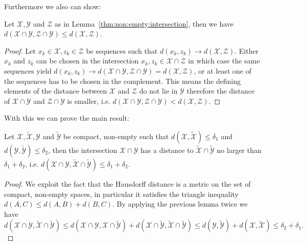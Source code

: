 %
Furthermore we also can show:
%
\begin{thm}
Let $\mathcal X,\mathcal Y$ and $\mathcal Z$ as in Lemma~\ref{thm:non:empty:intersection}, then we have $d(\mathcal X\cap\mathcal Y,\mathcal Z\cap\mathcal Y)\leq d(\mathcal X,\mathcal Z)$.
\end{thm}
%
\begin{proof}
Let $x_k\in\mathcal X,z_k\in\mathcal Z$ be sequences such that $d(x_k,z_k)\to d(\mathcal X,\mathcal Z)$.
%
Either $x_k$ and $z_k$ can be chosen in the intersection $x_k,z_k\in\mathcal X\cap\mathcal Z$ in which case the same sequences yield $d(x_k,z_k)\to d(\mathcal X\cap\mathcal Y,\mathcal Z\cap\mathcal Y) = d(\mathcal X,\mathcal Z)$, or at least one of the sequences has to be chosen in the complement.
%
This means the defining elements of the distance between $\mathcal X$ and $\mathcal Z$ do not lie in $\mathcal Y$ therefore the distance of $\mathcal X\cap\mathcal Y$ and $\mathcal Z\cap\mathcal Y$ is smaller, i.e. $d(\mathcal X\cap\mathcal Y,\mathcal Z\cap\mathcal Y)< d(\mathcal X,\mathcal Z)$.
\end{proof}
%
With this we can prove the main result:
%
\begin{thm}
Let $\mathcal X,\tilde{\mathcal X},\mathcal Y$ and $\tilde{\mathcal Y}$ be compact, non-empty such that $d(\mathcal X,\tilde{\mathcal X})\leq\delta_1$ and $d(\mathcal Y,\tilde{\mathcal Y})\leq\delta_2$, then the intersection $\mathcal X\cap \mathcal Y$ has a distance to $\tilde{\mathcal X}\cap\tilde{\mathcal Y}$ no larger than $\delta_1+\delta_2$, i.e. $d(\mathcal X\cap \mathcal Y,\tilde{\mathcal X}\cap\tilde{\mathcal Y})\leq\delta_1+\delta_2$.
\end{thm}
%
\begin{proof}
We exploit the fact that the Hausdorff distance is a metric on the set of compact, non-empty spaces, in particular it satisfies the triangle inequality $d(A,C)\leq d(A,B)+d(B,C)$.
%
By applying the previous lemma twice we have 
%
\begin{equation}
	d(\mathcal X\cap \mathcal Y,\tilde{\mathcal X}\cap\tilde{\mathcal Y}) \leq d(\mathcal X\cap \mathcal Y,\mathcal X\cap\tilde{\mathcal Y}) + d(\mathcal X\cap\tilde{\mathcal Y},\tilde{\mathcal X}\cap\tilde{\mathcal Y}) \leq d(\mathcal Y,\tilde{\mathcal Y}) + d(\mathcal X,\tilde{\mathcal X}) \leq \delta_2 + \delta_1.
\end{equation}
\end{proof}


